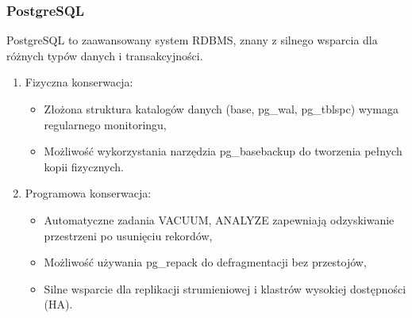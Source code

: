\documentclass[letterpaper,10pt,polish]{sphinxmanual}
\begin{document}
\subsubsection{PostgreSQL}
\label{\detokenize{rozdzial2/Kontrola_i_konserwacja/kontrola_i_konserwacja:postgresql}}
\sphinxAtStartPar
PostgreSQL to zaawansowany system RDBMS, znany z silnego wsparcia dla różnych typów danych i transakcyjności.
\begin{enumerate}
%
\item {} 
\sphinxAtStartPar
Fizyczna konserwacja:
\begin{itemize}
\item {} 
\sphinxAtStartPar
Złożona struktura katalogów danych (base, pg\_wal, pg\_tblspc) \textendash{} wymaga regularnego monitoringu,

\item {} 
\sphinxAtStartPar
Możliwość wykorzystania narzędzia pg\_basebackup do tworzenia pełnych kopii fizycznych.

\end{itemize}

\item {} 
\sphinxAtStartPar
Programowa konserwacja:
\begin{itemize}
\item {} 
\sphinxAtStartPar
Automatyczne zadania VACUUM, ANALYZE \textendash{} zapewniają odzyskiwanie przestrzeni po usunięciu rekordów,

\item {} 
\sphinxAtStartPar
Możliwość używania pg\_repack do defragmentacji bez przestojów,

\item {} 
\sphinxAtStartPar
Silne wsparcie dla replikacji strumieniowej i klastrów wysokiej dostępności (HA).

\end{itemize}

\end{enumerate}
\end{document}
